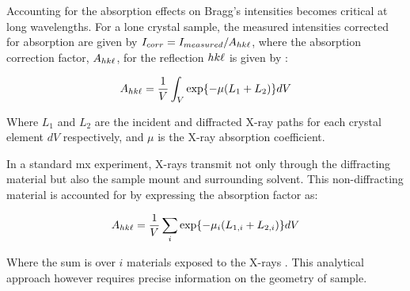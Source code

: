 


Accounting for the absorption effects on Bragg’s intensities becomes critical at long wavelengths. For a lone crystal sample, the measured intensities corrected for absorption are given by $I_{corr} = I_{measured}/A_{hk\ell}$, where the absorption correction factor, $A_{hk\ell}$, for the reflection $hk\ell$ is given by \cite{Albrecht1939}: %

\begin{equation}
    A_{hk\ell} = \frac{1}{V} \int_V \exp{-\mu(L_1+L_2)} dV
    \label{AbsFactor}
\end{equation}

Where $L_1$ and $L_2$ are the incident and diffracted X-ray paths for each crystal element $dV$ respectively, and $\mu$ is the X-ray absorption coefficient. \cite{Busing1957}

In a standard \ac{mx} experiment, X-rays transmit not only through the diffracting material but also the sample mount and surrounding solvent. This non-diffracting material is accounted for by expressing the absorption factor as:

\begin{equation}
    A_{hk\ell} = \frac{1}{V} \sum_i \exp{-\mu_i (L_{1,i}+L_{2,i})} dV
    \label{AbsFactor_allmaterials}
\end{equation}

Where the sum is over $i$ materials exposed to the X-rays \cite{Santoro1968}. This analytical approach however requires precise information on the geometry of sample.

